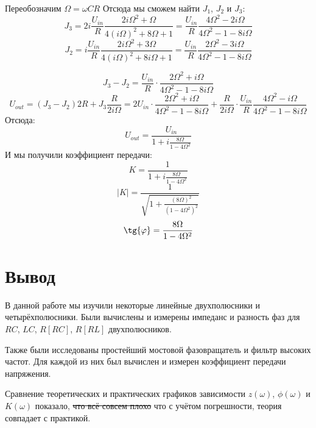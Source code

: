 Переобозначим $\Omega=\omega CR$
Отсюда мы сможем найти $J_1$, $J_2$ и $J_3$:
\begin{equation}
	J_3=2i\frac{U_{in}}{R}\frac{2i\Omega^2+\Omega}{4(i\Omega)^2+8\Omega+1}=\frac{U_{in}}{R}\frac{4\Omega^2-2i\Omega }{4\Omega^2-1-8i\Omega}
\end{equation}
\begin{equation}
	J_2=i\frac{U_{in}}{R}\frac{2i\Omega^2 +3\Omega}{4(i\Omega)^2+8i\Omega+1}=\frac{U_{in}}{R}\frac{2\Omega^2-3i\Omega}{4\Omega^2-1-8i\Omega}
\end{equation}


\begin{equation}
	J_3-J_2=\frac{U_{in}}{R}\cdot\frac{2\Omega^2 +i\Omega }{4\Omega^2-1-8i\Omega}
\end{equation}
\begin{equation}
	U_{out}=(J_3-J_2)2R+J_3\frac{R}{2i\Omega}=2U_{in}
		\cdot\frac{2\Omega^2+i\Omega}
								{4\Omega^2-1-8i\Omega}+
			\frac{R}{2i\Omega}\cdot \frac
			{U_{in}}{R}\frac{4\Omega^2-i\Omega}
								{4\Omega^2-1-8i\Omega}
	\end{equation}
	Отсюда:
	\begin{equation}
		U_{out}=\frac{U_{in}}{1+i\frac{8\Omega}{1-4\Omega^2}}
	\end{equation}
	И мы получили коэффициент передачи:
	\begin{equation}
		K=\frac{1}{1+i\frac{8\Omega}{1-4\Omega^2}}
	\end{equation}
	\begin{equation}
		|K|=\frac{1}{\sqrt{1+\frac{(8\Omega)^2}{(1-4\Omega^2)^2}}}
	\end{equation}
	\begin{equation}
		\tg{\phi}=\frac{8\Omega}{1-4\Omega^2}
	\end{equation}

\newpage
\section{Вывод}
 В данной работе мы изучили некоторые линейные двухполюсники и четырёхполюсники.
 Были вычислены и измерены импеданс и разность фаз для $RC$, $LC$, $R[RC]$, $R[RL]$ двухполюсников.
 
 Также были исследованы простейший мостовой фазовращатель и фильтр высоких частот.
 Для каждой из них был вычислен и измерен коэффициент передачи напряжения. 
 
 Сравнение теоретических и практических графиков зависимости $z(\omega)$, $\phi(\omega)$ и $K(\omega)$
показало, \sout{что всё совсем плохо} что с учётом погрешности, теория совпадает с практикой.


 
